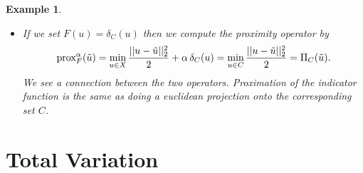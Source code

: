 \documentclass[abstracton]{scrreprt}
\newtheorem{example}[theorem]{Example}
\begin{document}
\begin{example}
\begin{itemize}
\begin{enumerate}
\begin{equation}
\begin{array}{l l}
                                       1 & \textnormal{otherwise}
                                    \end{array}
                                \right. .
                                \notag
                            \end{equation}
                    \end{enumerate}
                \item If we set $F(u) = \delta_{C}(u)$ then we compute the proximity operator by
                $$
                    \textnormal{prox}^{\alpha}_{F}(\tilde{u}) = \min\limits_{u \in X} \frac{||u - \tilde{u}||_{2}^{2}}{2} + \alpha \, \delta_{C}(u) = \min\limits_{u \in C} \frac{||u - \tilde{u}||_{2}^{2}}{2} = \Pi_{C}(\tilde{u}).
                $$
                We see a connection between the two operators. Proximation of the indicator function is the same as doing a euclidean projection onto the corresponding set $C$.
            \end{itemize}
        \end{example}
    \section{Total Variation} %
    \label{sec:total_variation}
        
\end{document}
